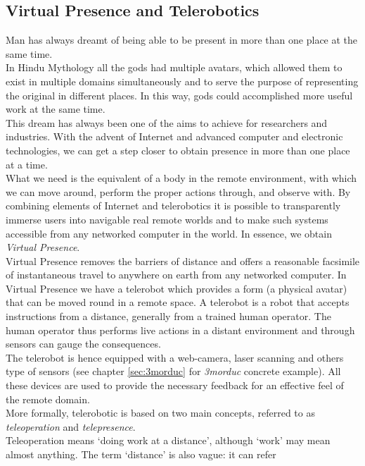 \subsection{Virtual Presence and Telerobotics}
\label{sec:virtual_presence}

Man has always dreamt of being able to be present in more than
one place at the same time.
\\
In Hindu Mythology all the gods had multiple avatars, which
allowed them to exist in multiple domains simultaneously and to
serve the purpose of representing the original in different
places. In this way, gods could accomplished more useful work
at the same time. 
\\
This dream has always been one of the aims to achieve for 
researchers and industries. With the advent of Internet and
advanced computer and electronic technologies, we can get a
step closer to obtain presence in more than one place
at a time.
\\
What we need is the equivalent of a body in the remote environment,
with which we can move around, perform the proper actions through,
and observe with. By combining elements of Internet and
telerobotics it is possible to transparently immerse users into
navigable real remote worlds and to make such systems accessible
from any networked computer in the world. In essence, we obtain
\textit{Virtual Presence}.
\\
Virtual Presence removes the barriers of distance and offers a
reasonable facsimile of instantaneous travel to anywhere on earth
from any networked computer.
In Virtual Presence we have a telerobot which provides a form
(a physical avatar) that can be moved round in a remote space.
A telerobot is a robot that accepts instructions from a distance,
generally from a trained human operator. The human operator thus
performs live actions in a distant environment and through sensors
can gauge the consequences.
\\
The telerobot is hence equipped with a web-camera, laser scanning and
others type of sensors (see chapter \ref{sec:3morduc} for \textit{3morduc}
concrete example). All these devices are used to provide the
necessary feedback for an effective feel of the remote domain.
\\
More formally, telerobotic is based on two main concepts, referred to
as \textit{teleoperation} and \textit{telepresence}.
\\
Teleoperation means `doing work at a distance', although `work' may
mean almost anything. The term `distance' is also vague: it can refer
